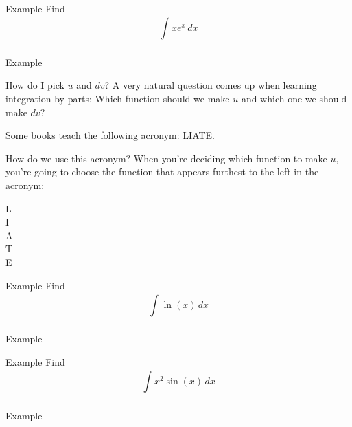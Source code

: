 \documentclass[presentation]{beamer}
\begin{document}
\begin{frame}[label={sec:orgc962f23}]{Example}
Find
\[
\int\limits_{}^{} xe^x\,dx \]
\vspace{10in}
\end{frame}

\begin{frame}[label={sec:orgb87a76d}]{Example}
\end{frame}

\begin{frame}[label={sec:org097e090}]{How do I pick \(u\) and \(dv\)?}
A very natural question comes up when learning integration by parts:
Which function should we make \(u\) and which one we should make \(dv\)?

Some books teach the following acronym: LIATE.

How do we use this acronym?  When you're deciding which function to
make \(u\), you're going to choose the function that appears furthest
to the left in the acronym:
\begin{description}
\item[{L}] 

\item[{I}] 

\item[{A}] 

\item[{T}] 

\item[{E}] 
\end{description}
\end{frame}

\begin{frame}[label={sec:orgf3b371d}]{Example}
Find
\[
\int\limits_{}^{} \ln (x)\,dx \]
\vspace{10in}
\end{frame}

\begin{frame}[label={sec:orge62d4af}]{Example}
\end{frame}

\begin{frame}[label={sec:org0b4e9f8}]{Example}
Find
\[
\int\limits_{}^{} x^2 \sin \left( x \right)\,dx \]
\vspace{10in}
\end{frame}

\begin{frame}[label={sec:org15c5b61}]{Example}
\end{frame}
\end{document}

